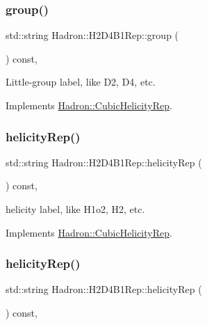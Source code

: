 \subsubsection{\texorpdfstring{group()}{group()}\hspace{0.1cm}{\footnotesize\ttfamily [5/5]}}
{\footnotesize\ttfamily std\+::string Hadron\+::\+H2\+D4\+B1\+Rep\+::group (\begin{DoxyParamCaption}{ }\end{DoxyParamCaption}) const\hspace{0.3cm}{\ttfamily [inline]}, {\ttfamily [virtual]}}

Little-\/group label, like D2, D4, etc. 

Implements \mbox{\hyperlink{structHadron_1_1CubicHelicityRep_a101a7d76cd8ccdad0f272db44b766113}{Hadron\+::\+Cubic\+Helicity\+Rep}}.

\mbox{\label{structHadron_1_1H2D4B1Rep_a0d3def772b80e7f84ff2c62569ffa710}} 
\subsubsection{\texorpdfstring{helicityRep()}{helicityRep()}\hspace{0.1cm}{\footnotesize\ttfamily [1/3]}}
{\footnotesize\ttfamily std\+::string Hadron\+::\+H2\+D4\+B1\+Rep\+::helicity\+Rep (\begin{DoxyParamCaption}{ }\end{DoxyParamCaption}) const\hspace{0.3cm}{\ttfamily [inline]}, {\ttfamily [virtual]}}

helicity label, like H1o2, H2, etc. 

Implements \mbox{\hyperlink{structHadron_1_1CubicHelicityRep_af1096946b7470edf0a55451cc662f231}{Hadron\+::\+Cubic\+Helicity\+Rep}}.

\mbox{\label{structHadron_1_1H2D4B1Rep_a0d3def772b80e7f84ff2c62569ffa710}} 
\subsubsection{\texorpdfstring{helicityRep()}{helicityRep()}\hspace{0.1cm}{\footnotesize\ttfamily [2/3]}}
{\footnotesize\ttfamily std\+::string Hadron\+::\+H2\+D4\+B1\+Rep\+::helicity\+Rep (\begin{DoxyParamCaption}{ }\end{DoxyParamCaption}) const\hspace{0.3cm}{\ttfamily [inline]}, {\ttfamily [virtual]}}

